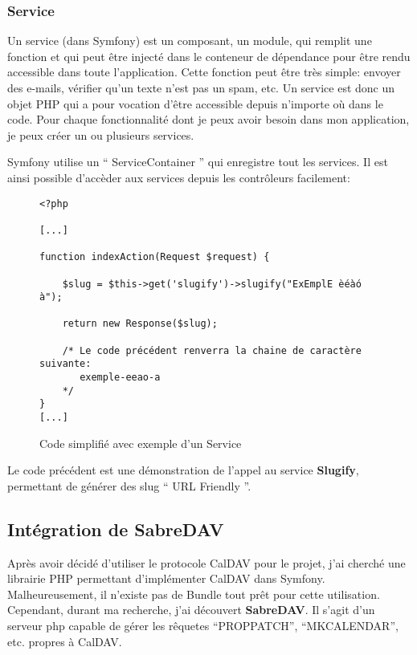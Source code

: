 \subsubsection*{Service}

Un service (dans Symfony) est un composant, un module, qui remplit une fonction et qui peut être injecté dans le conteneur de dépendance pour être rendu accessible dans toute l'application. Cette fonction peut être très simple: envoyer des e-mails, vérifier qu'un texte n'est pas un spam, etc. Un service est donc un objet PHP qui a pour vocation d'être accessible depuis n'importe où dans le code. Pour chaque fonctionnalité dont je peux avoir besoin dans mon application, je peux créer un ou plusieurs services.

Symfony utilise un `` ServiceContainer '' qui enregistre tout les services. Il est ainsi possible d'accèder aux services depuis les contrôleurs facilement:

\begin{figure}[H]
\begin{lstlisting}[frame=single]
<?php

[...]

function indexAction(Request $request) {

    $slug = $this->get('slugify')->slugify("ExEmplE èéàó à");

    return new Response($slug);

    /* Le code précédent renverra la chaine de caractère suivante:
       exemple-eeao-a
    */
}
[...]

\end{lstlisting}
\caption{Code simplifié avec exemple d'un Service}
\end{figure}

Le code précédent est une démonstration de l'appel au service \textbf{Slugify}, permettant de générer des slug `` URL Friendly ''.

\subsection{Intégration de SabreDAV}

Après avoir décidé d'utiliser le protocole CalDAV pour le projet, j'ai cherché une librairie PHP permettant d'implémenter CalDAV dans Symfony. Malheureusement, il n'existe pas de Bundle tout prêt pour cette utilisation. Cependant, durant ma recherche, j'ai découvert \textbf{SabreDAV}. Il s'agit d'un serveur php capable de gérer les rêquetes ``PROPPATCH'', ``MKCALENDAR'', etc. propres à CalDAV.

